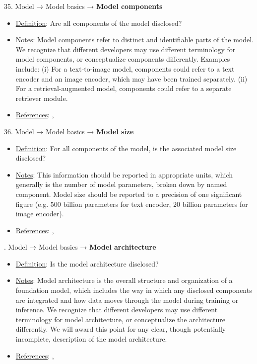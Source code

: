35. Model → Model basics → \textbf{Model components}
\vspace{-\parskip}
\begin{itemize}
	\item
	\underline{Definition}: Are all components of the model disclosed?
	\item
	\underline{Notes}: Model components refer to distinct and identifiable parts of the model. We recognize that different developers may use different terminology for model components, or conceptualize components differently. Examples include: (i) For a text-to-image model, components could refer to a text encoder and an image encoder, which may have been trained separately. (ii) For a retrieval-augmented model, components could refer to a separate retriever module.
	\item
	\underline{References}: \citet{mitchell2019model}, \citet{crisan2022interactive}
\end{itemize}


36. Model → Model basics → \textbf{Model size}
\vspace{-\parskip}
\begin{itemize}
	\item
	\underline{Definition}: For all components of the model, is the associated model size disclosed?
	\item
	\underline{Notes}: This information should be reported in appropriate units, which generally is the number of model parameters, broken down by named component. Model size should be reported to a precision of one significant figure (e.g. 500 billion parameters for text encoder, 20 billion parameters for image encoder).
	\item
	\underline{References}: \citet{mitchell2019model}, \citet{crisan2022interactive}
\end{itemize}


. Model → Model basics → \textbf{Model architecture}
\vspace{-\parskip}
\begin{itemize}
	\item
	\underline{Definition}: Is the model architecture disclosed?
	\item
	\underline{Notes}: Model architecture is the overall structure and organization of a foundation model, which includes the way in which any disclosed components are integrated and how data moves through the model during training or inference. We recognize that different developers may use different terminology for model architecture, or conceptualize the architecture differently. We will award this point for any clear, though potentially incomplete, description of the model architecture.
	\item
	\underline{References}: \citet{mitchell2019model}, \citet{crisan2022interactive}
\end{itemize}


